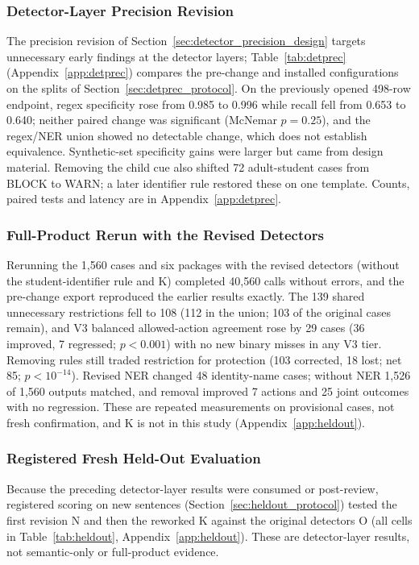 \documentclass[sigconf]{acmart}
\theoremstyle{acmdefinition}\newtheorem{property}{Property}
\begin{document}
\subsubsection{Detector-Layer Precision Revision}
\label{sec:detector_precision}
The precision revision of Section~\ref{sec:detector_precision_design} targets unnecessary early findings at the detector layers; Table~\ref{tab:detprec} (Appendix~\ref{app:detprec}) compares the pre-change and installed configurations on the splits of Section~\ref{sec:detprec_protocol}. On the previously opened 498-row endpoint, regex specificity rose from 0.985 to 0.996 while recall fell from 0.653 to 0.640; neither paired change was significant (McNemar $p=0.25$), and the regex/NER union showed no detectable change, which does not establish equivalence. Synthetic-set specificity gains were larger but came from design material. Removing the child cue also shifted 72 adult-student cases from BLOCK to WARN; a later identifier rule restored these on one template. Counts, paired tests and latency are in Appendix~\ref{app:detprec}.



\subsubsection{Full-Product Rerun with the Revised Detectors}
\label{sec:product_rerun}
Rerunning the 1,560 cases and six packages with the revised detectors (without the student-identifier rule and K) completed 40,560 calls without errors, and the pre-change export reproduced the earlier results exactly. The 139 shared unnecessary restrictions fell to 108 (112 in the union; 103 of the original cases remain), and V3 balanced allowed-action agreement rose by 29 cases (36 improved, 7 regressed; $p<0.001$) with no new binary misses in any V3 tier. Removing rules still traded restriction for protection (103 corrected, 18 lost; net 85; $p<10^{-14}$). Revised NER changed 48 identity-name cases; without NER 1,526 of 1,560 outputs matched, and removal improved 7 actions and 25 joint outcomes with no regression. These are repeated measurements on provisional cases, not fresh confirmation, and K is not in this study (Appendix~\ref{app:heldout}).

\subsubsection{Registered Fresh Held-Out Evaluation}
\label{sec:heldout}
Because the preceding detector-layer results were consumed or post-review, registered scoring on new sentences (Section~\ref{sec:heldout_protocol}) tested the first revision N and then the reworked K against the original detectors O (all cells in Table~\ref{tab:heldout}, Appendix~\ref{app:heldout}). These are detector-layer results, not semantic-only or full-product evidence.
\end{document}
